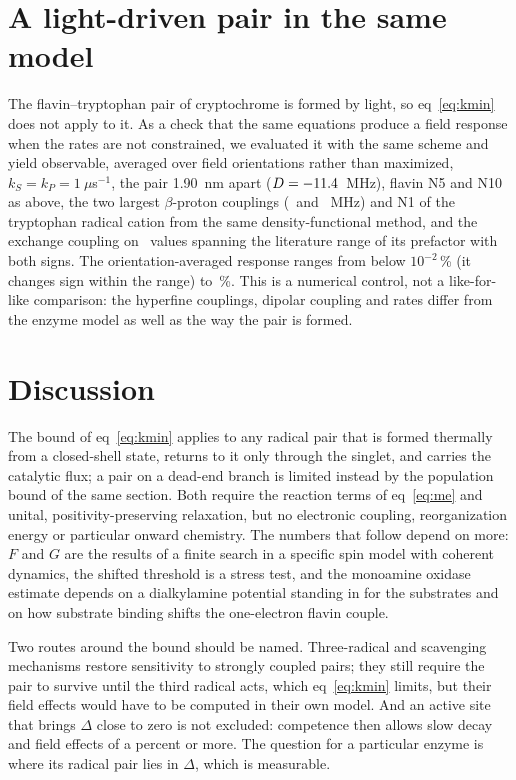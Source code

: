 \documentclass[journal=jpcbfk,manuscript=article,layout=traditional]{achemso}
\begin{document}
\section{A light-driven pair in the same model}

The flavin--tryptophan pair of cryptochrome is formed by light, so
eq~\ref{eq:kmin} does not apply to it. As a check that the same equations
produce a field response when the rates are not constrained, we evaluated it
with the same scheme and yield observable, averaged over field orientations
rather than maximized, $k_S = k_P = 1~\mu$s$^{-1}$, the pair
1.90~nm apart ($D = -11.4$~MHz), flavin N5 and N10 as above, the two largest
$\beta$-proton couplings (\aTrpOne\ and \aTrpTwo~MHz) and N1 of the tryptophan
radical cation from the same density-functional method, and the exchange
coupling on \nCry\ values spanning the literature range of its prefactor with
both signs.\cite{Efimova2008} The orientation-averaged response ranges from
below $10^{-2}$\,\% (it changes sign within the range) to \cryMax\,\%. This is
a numerical control, not a like-for-like comparison: the hyperfine couplings,
dipolar coupling and rates differ from the enzyme model as well as the way the
pair is formed.

\section{Discussion}

The bound of eq~\ref{eq:kmin} applies to any radical pair that is formed
thermally from a closed-shell state, returns to it only through the singlet,
and carries the catalytic flux; a pair on a dead-end branch is limited instead
by the population bound of the same section. Both require the reaction terms of
eq~\ref{eq:me} and unital, positivity-preserving relaxation, but no electronic
coupling, reorganization energy or particular onward chemistry. The numbers that
follow depend on more: $F$ and $G$ are the results of a finite search in a
specific spin model with coherent dynamics, the shifted threshold is a stress
test, and the monoamine oxidase estimate depends on a dialkylamine potential
standing in for the substrates and on how substrate binding shifts the
one-electron flavin couple.

Two routes around the bound should be named. Three-radical and scavenging
mechanisms\cite{Kattnig2017} restore sensitivity to strongly coupled pairs; they
still require the pair to survive until the third radical acts, which
eq~\ref{eq:kmin} limits, but their field effects would have to be computed in
their own model. And an active site that brings $\Delta$ close to zero is not
excluded: competence then allows slow decay and field effects of a percent or
more. The question for a particular enzyme is where its radical pair lies in
$\Delta$, which is measurable.
\end{document}
